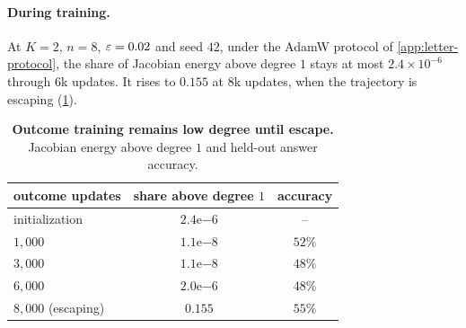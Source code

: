 \begin{table}[H]
\centering\small
{}
\caption{\textbf{The answer-dependent gradient decays with horizon while the step gradient does not.} Gradient norms at initialization,
seed $42$.}
\label{tab:spectrum}
\label{tab:spectrum-full}
\end{table}

\paragraph{During training.} At $K=2$, $n=8$, $\varepsilon=0.02$ and seed $42$, under the AdamW protocol of \cref{app:letter-protocol},
the share of Jacobian energy above degree $1$ stays at most $2.4\times10^{-6}$ through $6$k updates.
It rises to $0.155$ at $8$k updates, when the trajectory is escaping (\cref{tab:main-evidence}).

\begin{table}[H]
\centering\small
\begin{tabular}{@{}lcc@{}}
\toprule
outcome updates & share above degree $1$ & accuracy\\
\midrule
initialization & $2.4\mathrm{e}{-6}$ & --\\
$1{,}000$ & $1.1\mathrm{e}{-8}$ & $52\%$\\
$3{,}000$ & $1.1\mathrm{e}{-8}$ & $48\%$\\
$6{,}000$ & $2.0\mathrm{e}{-6}$ & $48\%$\\
$8{,}000$ (escaping) & $0.155$ & $55\%$\\
\bottomrule
\end{tabular}
\caption{\textbf{Outcome training remains low degree until escape.} Jacobian energy above degree $1$ and held-out answer accuracy.}
\label{tab:main-evidence}
\end{table}

